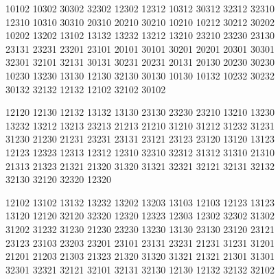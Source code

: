 \begingroup\small\ttfamily\begin{flushleft}
10102 10302 30302 32302 12302 12312 10312 30312 32312 32310\\
12310 10310 30310 20310 20210 30210 10210 10212 30212 30202\\
10202 13202 13102 13132 13232 13212 13210 23210 23230 23130\\
23131 23231 23201 23101 20101 30101 30201 20201 20301 30301\\
32301 32101 32131 30131 30231 20231 20131 20130 20230 30230\\
10230 13230 13130 12130 32130 30130 10130 10132 10232 30232\\
30132 32132 12132 12102 32102 30102\\
\end{flushleft}\endgroup
\begingroup\footnotesize\ttfamily\begin{flushleft}
12120 12130 12132 13132 13130 23130 23230 23210 13210 13230\\
13232 13212 13213 23213 21213 21210 31210 31212 31232 31231\\
31230 21230 21231 23231 23131 23121 23123 23120 13120 13123\\
12123 12323 12313 12312 12310 32310 32312 31312 31310 21310\\
21313 21323 21321 21320 31320 31321 32321 32121 32131 32132\\
32130 32120 32320 12320\\
\end{flushleft}\endgroup
\begingroup\footnotesize\ttfamily\begin{flushleft}
12102 13102 13132 13232 13202 13203 13103 12103 12123 13123\\
13120 12120 32120 32320 12320 12323 12303 12302 32302 31302\\
31202 31232 31230 21230 23230 13230 13130 23130 23120 23121\\
23123 23103 23203 23201 23101 23131 23231 21231 31231 31201\\
21201 21203 21303 21323 21320 31320 31321 21321 21301 31301\\
32301 32321 32121 32101 32131 32130 12130 12132 32132 32102\\
\end{flushleft}\endgroup

